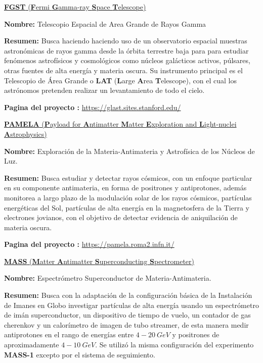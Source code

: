 \begin{itemize_f}
\item[-] \href{https://en.wikipedia.org/wiki/Fermi_Gamma-ray_Space_Telescope}{\textbf{FGST} (\textbf{F}ermi \textbf{G}amma-ray \textbf{S}pace \textbf{T}elescope)}
\begin{itemize_f}\label{fermi}
\item \textbf{Nombre:} Telescopio Espacial de Area Grande de Rayos Gamma  
\item \textbf{Resumen:} Busca haciendo haciendo uso de un observatorio espacial muestras astronómicas de rayos gamma desde la órbita terrestre baja para para estudiar fenómenos astrofísicos y cosmológicos como núcleos galácticos activos, púlsares, otras fuentes de alta energía y materia oscura. Su instrumento principal es el Telescopio de Área Grande o \textbf{LAT} (\textbf{L}arge \textbf{A}rea \textbf{T}elescope), con el cual los astrónomos pretenden realizar un levantamiento de todo el cielo. %
\item \textbf{Pagina del proyecto :} \url{https://glast.sites.stanford.edu/}
\end{itemize_f}

\item[-] \href{https://en.wikipedia.org/wiki/PAMELA_detector}{\textbf{PAMELA} (\textbf{P}ayload for \textbf{A}ntimatter \textbf{M}atter \textbf{E}xploration and \textbf{L}ight-nuclei \textbf{A}strophysics)}
\begin{itemize_f}\label{pamela}
\item \textbf{Nombre:} Exploración de la Materia-Antimateria y Astrofísica de los Núcleos de Luz.
\item \textbf{Resumen:} Busca estudiar y detectar rayos cósmicos, con un enfoque particular en su componente antimateria, en forma de positrones y antiprotones, además monitorea a largo plazo de la modulación solar de los rayos cósmicos, partículas energéticas del Sol, partículas de alta energía en la magnetosfera de la Tierra y electrones jovianos, con el objetivo de detectar evidencia de aniquilación de materia oscura.
\item \textbf{Pagina del proyecto :} \url{https://pamela.roma2.infn.it/}
\end{itemize_f}

\item[-] \href{https://stratocat.com.ar/fichas-e/1991/FSU-19910923.htm}{\textbf{MASS} (\textbf{M}atter \textbf{A}ntimatter \textbf{S}uperconducting \textbf{S}pectrometer)}
\begin{itemize_f}\label{mass}
\item \textbf{Nombre:} Espectrómetro Superconductor de Materia-Antimateria.
\item \textbf{Resumen:} Busca con la adaptación de la configuración básica de la Instalación de Imanes en Globo investigar partículas de alta energía usando un espectrómetro de imán superconductor, un dispositivo de tiempo de vuelo, un contador de gas cherenkov y un calorímetro de imagen de tubo streamer, de esta manera medir antiprotones en el rango de energías entre $4-20~GeV$ y positrones de aproximadamente $4-10~GeV$. Se utilizó la misma configuración del experimento \textbf{MASS-1} excepto por el sistema de seguimiento.


\end{itemize_f}
\end{itemize_f}
